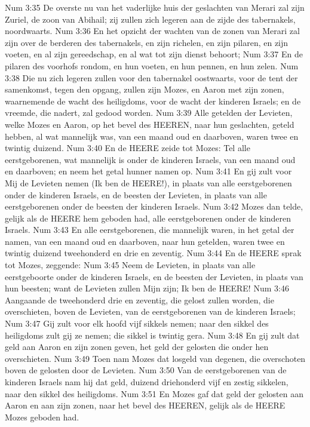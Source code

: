 Num 3:35  De overste nu van het vaderlijke huis der geslachten van Merari zal zijn Zuriel, de zoon van Abihail; zij zullen zich legeren aan de zijde des tabernakels, noordwaarts.
Num 3:36  En het opzicht der wachten van de zonen van Merari zal zijn over de berderen des tabernakels, en zijn richelen, en zijn pilaren, en zijn voeten, en al zijn gereedschap, en al wat tot zijn dienst behoort;
Num 3:37  En de pilaren des voorhofs rondom, en hun voeten, en hun pennen, en hun zelen.
Num 3:38  Die nu zich legeren zullen voor den tabernakel oostwaarts, voor de tent der samenkomst, tegen den opgang, zullen zijn Mozes, en Aaron met zijn zonen, waarnemende de wacht des heiligdoms, voor de wacht der kinderen Israels; en de vreemde, die nadert, zal gedood worden.
Num 3:39  Alle getelden der Levieten, welke Mozes en Aaron, op het bevel des HEEREN, naar hun geslachten, geteld hebben, al wat mannelijk was, van een maand oud en daarboven, waren twee en twintig duizend.
Num 3:40  En de HEERE zeide tot Mozes: Tel alle eerstgeborenen, wat mannelijk is onder de kinderen Israels, van een maand oud en daarboven; en neem het getal hunner namen op.
Num 3:41  En gij zult voor Mij de Levieten nemen (Ik ben de HEERE!), in plaats van alle eerstgeborenen onder de kinderen Israels, en de beesten der Levieten, in plaats van alle eerstgeborenen onder de beesten der kinderen Israels.
Num 3:42  Mozes dan telde, gelijk als de HEERE hem geboden had, alle eerstgeborenen onder de kinderen Israels.
Num 3:43  En alle eerstgeborenen, die mannelijk waren, in het getal der namen, van een maand oud en daarboven, naar hun getelden, waren twee en twintig duizend tweehonderd en drie en zeventig.
Num 3:44  En de HEERE sprak tot Mozes, zeggende:
Num 3:45  Neem de Levieten, in plaats van alle eerstgeboorte onder de kinderen Israels, en de beesten der Levieten, in plaats van hun beesten; want de Levieten zullen Mijn zijn; Ik ben de HEERE!
Num 3:46  Aangaande de tweehonderd drie en zeventig, die gelost zullen worden, die overschieten, boven de Levieten, van de eerstgeborenen van de kinderen Israels;
Num 3:47  Gij zult voor elk hoofd vijf sikkels nemen; naar den sikkel des heiligdoms zult gij ze nemen; die sikkel is twintig gera.
Num 3:48  En gij zult dat geld aan Aaron en zijn zonen geven, het geld der gelosten die onder hen overschieten.
Num 3:49  Toen nam Mozes dat losgeld van degenen, die overschoten boven de gelosten door de Levieten.
Num 3:50  Van de eerstgeborenen van de kinderen Israels nam hij dat geld, duizend driehonderd vijf en zestig sikkelen, naar den sikkel des heiligdoms.
Num 3:51  En Mozes gaf dat geld der gelosten aan Aaron en aan zijn zonen, naar het bevel des HEEREN, gelijk als de HEERE Mozes geboden had.

